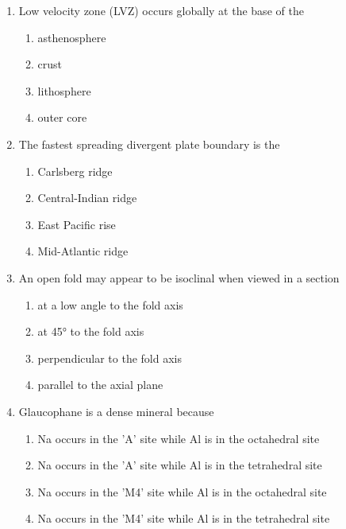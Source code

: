 \documentclass[journal,12pt,onecolumn]{IEEEtran}
\theoremstyle{remark}
\begin{document}
\begin{enumerate}[resume]
\item Low velocity zone (LVZ) occurs globally at the base of the
\begin{multicols}{4}
\begin{enumerate}
\item asthenosphere
\item crust
\item lithosphere
\item outer core
\end{enumerate}
\end{multicols}
\vspace{0.5cm}

\item The fastest spreading divergent plate boundary is the
\begin{multicols}{2}
\begin{enumerate}
\item Carlsberg ridge
\item Central-Indian ridge
\item East Pacific rise
\item Mid-Atlantic ridge
\end{enumerate}
\end{multicols}
\vspace{0.5cm}

\item An open fold may appear to be isoclinal when viewed in a section
\begin{multicols}{2}
\begin{enumerate}
\item at a low angle to the fold axis
\item at 45° to the fold axis
\item perpendicular to the fold axis
\item parallel to the axial plane
\end{enumerate}
\end{multicols}
\vspace{0.5cm}

\item Glaucophane is a dense mineral because
\begin{enumerate}
\item Na occurs in the 'A' site while Al is in the octahedral site
\item Na occurs in the 'A' site while Al is in the tetrahedral site
\item Na occurs in the 'M4' site while Al is in the octahedral site
\item Na occurs in the 'M4' site while Al is in the tetrahedral site
\vspace{0.5cm}
\end{enumerate}



\end{enumerate}
\end{document}
